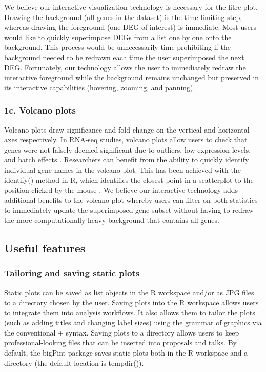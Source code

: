\documentclass{bmcart}
\begin{document}
We believe our interactive visualization technology is necessary for the litre plot. Drawing the background (all genes in the dataset) is the time-limiting step, whereas drawing the foreground (one DEG of interest) is immediate. Most users would like to quickly superimpose DEGs from a list one by one onto the background. This process would be unnecessarily time-prohibiting if the background needed to be redrawn each time the user superimposed the next DEG. Fortunately, our technology allows the user to immediately redraw the interactive foreground while the background remains unchanged but preserved in its interactive capabilities (hovering, zooming, and panning).

\subsubsection*{1c. Volcano plots}

Volcano plots draw significance and fold change on the vertical and horizontal axes respectively. In RNA-seq studies, volcano plots allow users to check that genes were not falsely deemed significant due to outliers, low expression levels, and batch effects \cite{li2011application}. Researchers can benefit from the ability to quickly identify individual gene names in the volcano plot. This has been achieved with the identify() method in R, which identifies the closest point in a scatterplot to the position clicked by the mouse \cite{li2011application}. We believe our interactive technology adds additional benefits to the volcano plot whereby users can filter on both statistics to immediately update the superimposed gene subset without having to redraw the more computationally-heavy background that contains all genes.




\subsection*{Useful features}

\subsubsection*{Tailoring and saving static plots}

Static plots can be saved as list objects in the R workspace and/or as JPG files to a directory chosen by the user. Saving plots into the R workspace allows users to integrate them into analysis workflows. It also allows them to tailor the plots (such as adding titles and changing label sizes) using the grammar of graphics via the conventional + syntax. Saving plots to a directory allows users to keep professional-looking files that can be inserted into proposals and talks. By default, the bigPint package saves static plots both in the R workspace and a directory (the default location is tempdir()).
\end{document}
